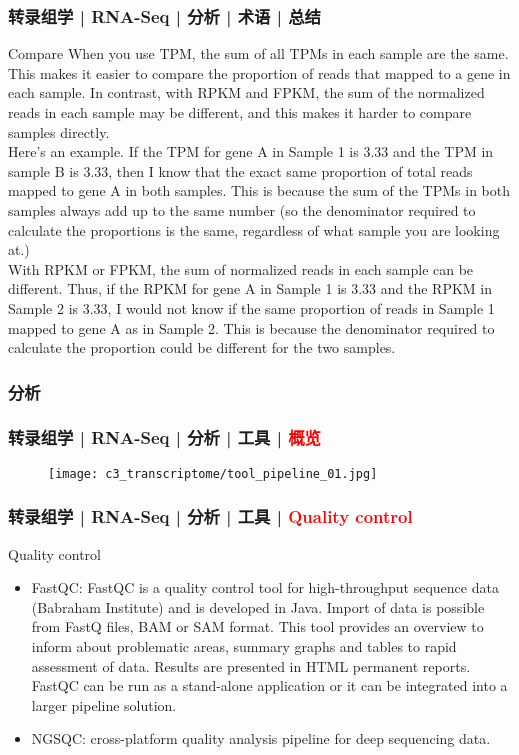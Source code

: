 \begin{frame}
  \frametitle{转录组学 | RNA-Seq | 分析 | 术语 | 总结}
  {\footnotesize
  \begin{block}{Compare}
    When you use TPM, the sum of all TPMs in each sample are the same. This makes it easier to compare the proportion of reads that mapped to a gene in each sample. In contrast, with RPKM and FPKM, the sum of the normalized reads in each sample may be different, and this makes it harder to compare samples directly.\\
    \vspace{0.5em}
    Here's an example. If the TPM for gene A in Sample 1 is 3.33 and the TPM in sample B is 3.33, then I know that the exact same proportion of total reads mapped to gene A in both samples. This is because the sum of the TPMs in both samples always add up to the same number (so the denominator required to calculate the proportions is the same, regardless of what sample you are looking at.)\\
    \vspace{0.5em}
    With RPKM or FPKM, the sum of normalized reads in each sample can be different. Thus, if the RPKM for gene A in Sample 1 is 3.33 and the RPKM in Sample 2 is 3.33, I would not know if the same proportion of reads in Sample 1 mapped to gene A as in Sample 2. This is because the denominator required to calculate the proportion could be different for the two samples.
  \end{block}
  }
\end{frame}

\subsubsection{分析}
\begin{frame}
  \frametitle{转录组学 | RNA-Seq | 分析 | 工具 | \textcolor{red}{概览}}
  \begin{figure}
    \centering
    \texttt{[image: c3\_transcriptome/tool\_pipeline\_01.jpg]}
  \end{figure}
\end{frame}

\begin{frame}
  \frametitle{转录组学 | RNA-Seq | 分析 | 工具 | \textcolor{red}{Quality control}}
  \begin{block}{Quality control}
    \begin{itemize}
      \item FastQC: FastQC is a quality control tool for high-throughput sequence data (Babraham Institute) and is developed in Java. Import of data is possible from FastQ files, BAM or SAM format. This tool provides an overview to inform about problematic areas, summary graphs and tables to rapid assessment of data. Results are presented in HTML permanent reports. FastQC can be run as a stand-alone application or it can be integrated into a larger pipeline solution.
      \item NGSQC: cross-platform quality analysis pipeline for deep sequencing data.
    \end{itemize}
  \end{block}
\end{frame}

